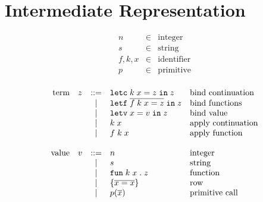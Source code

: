 \documentclass[11pt]{article}
\newcommand{\kw}[1]{\mathtt{#1}}
\begin{document}
\newpage

\section{Intermediate Representation}

\newcommand{\appc}[2]{#1\;#2}
\newcommand{\appf}[3]{#1\;#2\;#3}
\newcommand{\letc}[4]{\kw{letc}\;#1\;#2 = #3\;\kw{in}\;#4}

\newcommand{\defterm}[4]{#1\;#2\;#3 = #4}
\newcommand{\letf}[2]{\kw{letf}\;\rep{#1}\;\kw{in}\;#2}
\newcommand{\letff}[2]{\kw{letf}\;#1\;\kw{in}\;#2}

\newcommand{\letv}[3]{\kw{letv}\;#1 = #2\;\kw{in}\;#3}

\newcommand{\funv}[3]{\kw{fun}\;#1\;#2\;.\;#3}
\newcommand{\intv}[1]{#1}
\newcommand{\prmv}[2]{#1(#2)}
\newcommand{\rowv}[2]{\{ \rep{#1 = #2} \}}
\newcommand{\rowvs}[2]{\{ #1 \}}
\newcommand{\strv}[1]{#1}

\newcommand{\andv}[2]{\kw{concat}\;#1\;#2}
\newcommand{\argv}[1]{\kw{argument}\;#1}
\newcommand{\capv}[2]{\kw{capability}\;#1\;#2}
\newcommand{\selv}[2]{\kw{select}\;#1\;#2}

\[
\begin{array}{lcl}
n & \in & \text{integer} \\
s & \in & \text{string} \\
f, k, x & \in & \text{identifier} \\
p & \in & \text{primitive} \\
\end{array}
\]

\[
\begin{array}{rlcll}
\text{term}
  & z & ::= & \letc{k}{x}{z}{z}              & \text{bind continuation} \\
  &   & |   & \letf{\defterm{f}{k}{x}{z}}{z} & \text{bind functions} \\
  &   & |   & \letv{x}{v}{z}                 & \text{bind value} \\
  &   & |   & \appc{k}{x}                    & \text{apply continuation} \\
  &   & |   & \appf{f}{k}{x}                 & \text{apply function} \\
\\
\text{value}
  & v & ::= & \intv{n}           & \text{integer}  \\
  &   & |   & \strv{s}           & \text{string} \\
  &   & |   & \funv{k}{x}{z}     & \text{function} \\
  &   & |   & \rowv{x}{x}        & \text{row} \\
  &   & |   & \prmv{p}{\rep{x}}  & \text{primitive call} \\
\end{array}
\]
\end{document}
